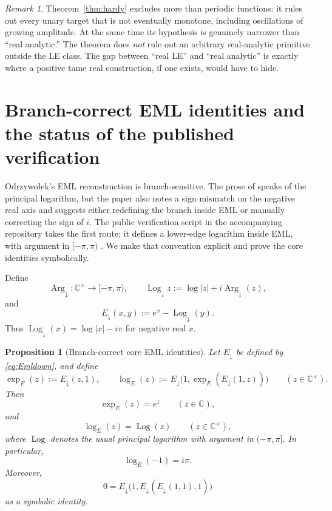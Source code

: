 \documentclass[12pt]{amsart}
\newtheorem{proposition}[theorem]{Proposition}
\theoremstyle{remark}
\newtheorem*{remark}{Remark}
\newcommand{\C}{\mathbb{C}}
\newcommand{\Edown}{E_{\downarrow}}
\newcommand{\Argdown}{\operatorname{Arg}_{\downarrow}}
\newcommand{\Logdown}{\operatorname{Log}_{\downarrow}}
\newcommand{\Logpr}{\operatorname{Log}}
\begin{document}
\begin{remark}
Theorem~\ref{thm:hardy} excludes more than periodic functions: it rules out every unary target that is not eventually monotone, including oscillations of growing amplitude.  At the same time its hypothesis is genuinely narrower than ``real analytic.''  The theorem does \emph{not} rule out an arbitrary real-analytic primitive outside the LE class.  The gap between ``real LE'' and ``real analytic'' is exactly where a positive tame real construction, if one exists, would have to hide.
\end{remark}

\section{Branch-correct EML identities and the status of the published verification}\label{sec:eml}

Odrzywo\l{}ek's EML reconstruction is branch-sensitive.  The prose of \cite{Odrzywolek2026} speaks of the principal logarithm, but the paper also notes a sign mismatch on the negative real axis and suggests either redefining the branch inside EML or manually correcting the sign of $i$.  The public verification script in the accompanying repository takes the first route: it defines a lower-edge logarithm inside EML, with argument in $[-\pi,\pi)$ \cite{OdrzywolekVerifier2026}.  We make that convention explicit and prove the core identities symbolically.

Define
\[
\Argdown:\C^{\times}\to[-\pi,\pi),
\qquad
\Logdown z:=\log|z|+i\Argdown(z),
\]
and
\begin{equation}\label{eq:Emldown}
\Edown(x,y):=e^x-\Logdown(y).
\end{equation}
Thus $\Logdown(x)=\log|x|-i\pi$ for negative real $x$.

\begin{proposition}[Branch-correct core EML identities]\label{prop:emlcore}
Let $\Edown$ be defined by \eqref{eq:Emldown}, and define
\[
\exp_E(z):=\Edown(z,1),
\qquad
\log_E(z):=\Edown\bigl(1,\exp_E(\Edown(1,z))\bigr)
\qquad (z\in\C^{\times}).
\]
Then
\[
\exp_E(z)=e^z
\qquad (z\in\C),
\]
and
\[
\log_E(z)=\Logpr(z)
\qquad (z\in\C^{\times}),
\]
where $\Logpr$ denotes the usual principal logarithm with argument in $(-\pi,\pi]$.  In particular,
\[
\log_E(-1)=i\pi.
\]
Moreover,
\[
0=\Edown\bigl(1,\Edown(\Edown(1,1),1)\bigr)
\]
as a symbolic identity.
\end{proposition}
\end{document}
